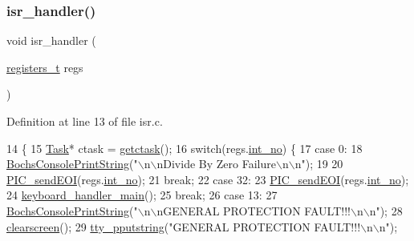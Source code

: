 \subsubsection{\texorpdfstring{isr\+\_\+handler()}{isr\_handler()}}
{\footnotesize\ttfamily void isr\+\_\+handler (\begin{DoxyParamCaption}\item[{\hyperlink{a00095_adf58dbaf6139b4957c348711f2026957_adf58dbaf6139b4957c348711f2026957}{registers\+\_\+t}}]{regs }\end{DoxyParamCaption})}



Definition at line 13 of file isr.\+c.


\begin{DoxyCode}
14 \{
15     \hyperlink{a00182}{Task}* ctask = \hyperlink{a00068_a5913e9b2190b2b4118ee020721a320e2_a5913e9b2190b2b4118ee020721a320e2}{getctask}();
16     \textcolor{keywordflow}{switch}(regs.\hyperlink{a00202_af311750a9b18afb3b1ed2d144fbe1cb0_af311750a9b18afb3b1ed2d144fbe1cb0}{int\_no}) \{
17         \textcolor{keywordflow}{case} 0:
18             \hyperlink{a00056_a19e1f554d03c977f8b947f21489daa41_a19e1f554d03c977f8b947f21489daa41}{BochsConsolePrintString}(\textcolor{stringliteral}{"\(\backslash\)n\(\backslash\)nDivide By Zero Failure\(\backslash\)n\(\backslash\)n"});
19             
20             \hyperlink{a00035_a1119739f7932598c83c3f8ce42a649de_a1119739f7932598c83c3f8ce42a649de}{PIC\_sendEOI}(regs.\hyperlink{a00202_af311750a9b18afb3b1ed2d144fbe1cb0_af311750a9b18afb3b1ed2d144fbe1cb0}{int\_no});
21             \textcolor{keywordflow}{break};
22         \textcolor{keywordflow}{case} 32:
23             \hyperlink{a00035_a1119739f7932598c83c3f8ce42a649de_a1119739f7932598c83c3f8ce42a649de}{PIC\_sendEOI}(regs.\hyperlink{a00202_af311750a9b18afb3b1ed2d144fbe1cb0_af311750a9b18afb3b1ed2d144fbe1cb0}{int\_no});
24             \hyperlink{a00029_a1db933be72a0547c4070ba55e6697ba2_a1db933be72a0547c4070ba55e6697ba2}{keyboard\_handler\_main}();
25             \textcolor{keywordflow}{break};
26         \textcolor{keywordflow}{case} 13:
27             \hyperlink{a00056_a19e1f554d03c977f8b947f21489daa41_a19e1f554d03c977f8b947f21489daa41}{BochsConsolePrintString}(\textcolor{stringliteral}{"\(\backslash\)n\(\backslash\)nGENERAL PROTECTION FAULT!!!\(\backslash\)n\(\backslash\)n"});
28             \hyperlink{a00140_aff4bc17c602603d120756f52e18ebb96_aff4bc17c602603d120756f52e18ebb96}{clearscreen}();
29             \hyperlink{a00140_ade960b1320324706aac6c00cc6b1b2fe_ade960b1320324706aac6c00cc6b1b2fe}{tty\_pputstring}(\textcolor{stringliteral}{"GENERAL PROTECTION FAULT!!!\(\backslash\)n\(\backslash\)n"});

\end{DoxyCode}
